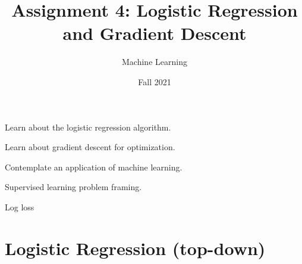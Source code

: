 \documentclass[assignment04_Solutions]{subfiles}
\title{Assignment 4: Logistic Regression and Gradient Descent}
\author{Machine Learning}
\date{Fall 2021}
\begin{document}
\maketitle
\thispagestyle{firstpage}


\begin{learningobjectives}
\bi
\item Learn about the logistic regression algorithm.
\item Learn about gradient descent for optimization.
\item Contemplate an application of machine learning.
\ei
\end{learningobjectives}


\begin{priorknowledge}
\bi
\item Supervised learning problem framing.
\item Log loss

\ei
\end{priorknowledge}
\vspace{1em}

%
%

\section{Logistic Regression (top-down)}
\end{document}
